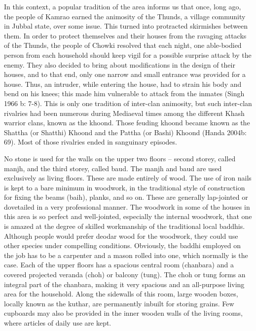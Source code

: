 In this context, a popular tradition of the area informs us that once, long ago, the people of Kamrao earned the animosity of the Thunds, a village community in Jubbal state, over some issue. This turned into protracted skirmishes between them. In order to protect themselves and their houses from the ravaging attacks of the Thunds, the people of Chowki resolved that each night, one able-bodied person from each household should keep vigil for a possible surprise attack by the enemy. They also decided to bring about modifications in the design of their houses, and to that end, only one narrow and small entrance was provided for a house. Thus, an intruder, while entering the house, had to strain his body and bend on his knees; this made him vulnerable to attack from the inmates (Singh 1966 b: 7-8). This is only one tradition of inter-clan animosity, but such inter-clan rivalries had been numerous during Mediaeval times among the different Khash warrior clans, known as the khoond. Those feuding khoond became known as the Shattha (or Shatthi) Khoond and the Pattha (or Bashi) Khoond (Handa 2004b: 69). Most of those rivalries ended in sanguinary episodes.

No stone is used for the walls on the upper two floors – second storey, called manjh, and the third storey, called baud. The manjh and baud are used exclusively as living floors. These are made entirely of wood. The use of iron nails is kept to a bare minimum in woodwork, in the traditional style of construction for fixing the beams (baih), planks, and so on. These are generally lap-jointed or dovetailed in a very professional manner. The woodwork in some of the houses in this area is so perfect and well-jointed, especially the internal woodwork, that one is amazed at the degree of skilled workmanship of the traditional local baddhis. Although people would prefer deodar wood for the woodwork, they could use other species under compelling conditions. Obviously, the baddhi employed on the job has to be a carpenter and a mason rolled into one, which normally is the case. Each of the upper floors has a spacious central room (chanbara) and a covered projected veranda (choh) or balcony (tung). The choh or tung forms an integral part of the chanbara, making it very spacious and an all-purpose living area for the household. Along the sidewalls of this room, large wooden boxes, locally known as the kuthar, are permanently inbuilt for storing grains. Few cupboards may also be provided in the inner wooden walls of the living rooms, where articles of daily use are kept.

